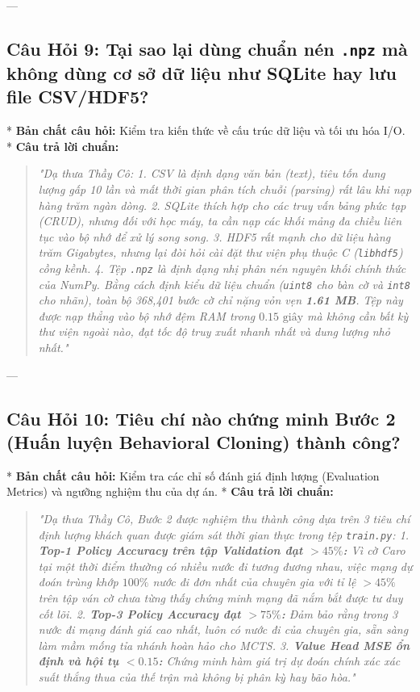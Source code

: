 \documentclass[11pt,a4paper]{report}
\begin{document}
---

\subsection*{Câu Hỏi 9: Tại sao lại dùng chuẩn nén \texttt{.npz} mà không dùng cơ sở dữ liệu như SQLite hay lưu file CSV/HDF5?}
* \textbf{Bản chất câu hỏi:} Kiểm tra kiến thức về cấu trúc dữ liệu và tối ưu hóa I/O.
* \textbf{Câu trả lời chuẩn:}
  \begin{quote}
  \textit{"Dạ thưa Thầy Cô:
  1. CSV là định dạng văn bản (text), tiêu tốn dung lượng gấp 10 lần và mất thời gian phân tích chuỗi (parsing) rất lâu khi nạp hàng trăm ngàn dòng.
  2. SQLite thích hợp cho các truy vấn bảng phức tạp (CRUD), nhưng đối với học máy, ta cần nạp các khối mảng đa chiều liên tục vào bộ nhớ để xử lý song song.
  3. HDF5 rất mạnh cho dữ liệu hàng trăm Gigabytes, nhưng lại đòi hỏi cài đặt thư viện phụ thuộc C (\texttt{libhdf5}) cồng kềnh.
  4. Tệp \texttt{.npz} là định dạng nhị phân nén nguyên khối chính thức của NumPy. Bằng cách định kiểu dữ liệu chuẩn (\texttt{uint8} cho bàn cờ và \texttt{int8} cho nhãn), toàn bộ 368,401 bước cờ chỉ nặng vỏn vẹn \textbf{1.61 MB}. Tệp này được nạp thẳng vào bộ nhớ đệm RAM trong $0.15\text{ giây}$ mà không cần bất kỳ thư viện ngoài nào, đạt tốc độ truy xuất nhanh nhất và dung lượng nhỏ nhất."}
  \end{quote}

---

\subsection*{Câu Hỏi 10: Tiêu chí nào chứng minh Bước 2 (Huấn luyện Behavioral Cloning) thành công?}
* \textbf{Bản chất câu hỏi:} Kiểm tra các chỉ số đánh giá định lượng (Evaluation Metrics) và ngưỡng nghiệm thu của dự án.
* \textbf{Câu trả lời chuẩn:}
  \begin{quote}
  \textit{"Dạ thưa Thầy Cô, Bước 2 được nghiệm thu thành công dựa trên 3 tiêu chí định lượng khách quan được giám sát thời gian thực trong tệp \texttt{train.py}:
  1. \textbf{Top-1 Policy Accuracy trên tập Validation đạt $> 45\%$:} Vì cờ Caro tại một thời điểm thường có nhiều nước đi tương đương nhau, việc mạng dự đoán trùng khớp $100\%$ nước đi đơn nhất của chuyên gia với tỉ lệ $> 45\%$ trên tập ván cờ chưa từng thấy chứng minh mạng đã nắm bắt được tư duy cốt lõi.
  2. \textbf{Top-3 Policy Accuracy đạt $> 75\%$:} Đảm bảo rằng trong 3 nước đi mạng đánh giá cao nhất, luôn có nước đi của chuyên gia, sẵn sàng làm mầm mống tỉa nhánh hoàn hảo cho MCTS.
  3. \textbf{Value Head MSE ổn định và hội tụ $< 0.15$:} Chứng minh hàm giá trị dự đoán chính xác xác suất thắng thua của thế trận mà không bị phân kỳ hay bão hòa."}
  \end{quote}
\end{document}
